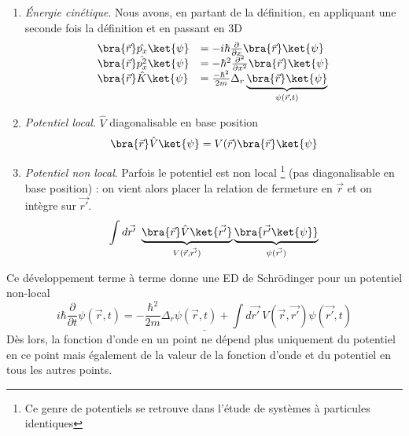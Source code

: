 	\begin{enumerate}
	\item \textit{Énergie cinétique}. Nous avons, en partant de la définition, en appliquant une 
	seconde fois la définition et en passant en 3D
	\begin{equation}
	\begin{array}{ll}
	\bra{\vec{r}}\hat{p_x}\ket{\psi} &= -i\hbar\frac{\partial}{\partial x}\bra{\vec{r}}\ket{\psi}\\
	\bra{\vec{r}}\hat{p_x^2}\ket{\psi} &= -\hbar^2\frac{\partial^2}{\partial x^2}\bra{\vec{r}}\ket{\psi}	\\
	\bra{\vec{r}}\hat{K}\ket{\psi} &= \frac{-\hbar^2}
	{2m}\Delta_r\underbrace{\bra{\vec{r}}\ket{\psi}}_{\psi(\vec{r},t)}
	\end{array}
	\end{equation}
	
	\item \textit{Potentiel local}. $\hat V$ diagonalisable en base position
	\begin{equation}
	\bra{\vec{r}}\hat{V}\ket{\psi} = V(\vec{r})\bra{\vec{r}}\ket{\psi}
	\end{equation}
	
	\item \textit{Potentiel non local}. Parfois le potentiel est non local \footnote{Ce genre de potentiels se retrouve
	dans l'étude de systèmes à particules identiques} (pas diagonalisable en base position) : on vient 
	alors placer la relation de fermeture en $\vec r$ et on intègre sur $\vec{r'}$.
	\begin{equation}
	\int d\vec{r'}\ \underbrace{\bra{\vec{r}}\hat{V}\ket{\vec{r'}}}_{V(\vec{r},\vec{r'})}\underbrace{
	\bra{\vec{r'}\ket{\psi}}}_{\psi(\vec{r'})}
	\end{equation}
	\end{enumerate}
	Ce développement terme à terme donne une ED de Schrödinger pour un potentiel non-local
	\begin{equation}
	\underline{i\hbar\frac{\partial}{\partial t}\psi(\vec{r},t) = -\frac{\hbar^2}{2m}\Delta_r\psi(\vec{r},t)+\int 
	d\vec{r'}\ V(\vec{r},\vec{r'})\psi(\vec{r'},t)}
	\end{equation}
	Dès lors, la fonction d'onde en un point ne dépend plus uniquement du potentiel en ce point mais
	également de la valeur de la fonction d'onde et du potentiel en tous les autres points.

